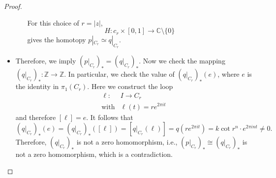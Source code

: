 \begin{proof}
\begin{itemize}
\begin{itemize}
For this choice of $r=|z|$, 
\[
H:c_r\times[0,1]\to\mathbb{C}\setminus\{0\}
\]
gives the homotopy $p|_{C_r}\simeq q|_{C_r}$.
\end{itemize}
\item
Therefore, we imply $(p|_{C_r})_*=(q|_{C_r})_*$.
Now we check the mapping $(q|_{C_r})_*:\mathbb{Z}\to\mathbb{Z}$.
In particular, we check the value of $(q|_{C_r})_*(e)$, where $e$ is the identity in $\pi_1(C_r)$.
Here we construct the loop
\[
\begin{array}{ll}
\ell:&I\to C_r\\
\text{with}&\ell(t)=re^{2\pi it}
\end{array}
\]
and therefore $[\ell]=e$. It follows that 
\[
(q|_{C_r})_*(e) = (q|_{C_r})_*([\ell])=[q|_{C_r}(\ell)]=q(re^{2\pi it})=k\cot r^n\cdot e^{2\pi int}\ne0.
\]
Therefore, $(q|_{C_r})_*$ is not a zero homomorphism, i.e., $(p|_{C_r})_*\cong (q|_{C_r})_*$ is not a zero homomorphism, which is a contradiction.
\end{itemize}

\end{proof}













